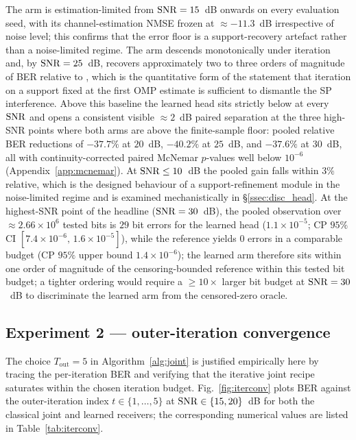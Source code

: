 The \Serial{} arm is estimation-limited from $\mathrm{SNR} = 15$~dB onwards on every evaluation seed, with its channel-estimation NMSE frozen at $\approx -11.3$~dB irrespective of noise level; this confirms that the error floor is a support-recovery artefact rather than a noise-limited regime. The \ClassicalJoint{} arm descends monotonically under iteration and, by $\mathrm{SNR} = 25$~dB, recovers approximately two to three orders of magnitude of BER relative to \Serial{}, which is the quantitative form of the statement that iteration on a support fixed at the first OMP estimate is sufficient to dismantle the SP interference. Above this baseline the learned head sits strictly below \ClassicalJoint{} at every $\mathrm{SNR}$ and opens a consistent visible $\approx 2$~dB paired separation at the three high-SNR points where both arms are above the finite-sample floor: pooled relative BER reductions of $-37.7\%$ at $20$~dB, $-40.2\%$ at $25$~dB, and $-37.6\%$ at $30$~dB, all with continuity-corrected paired McNemar $p$-values well below $10^{-6}$ (Appendix~\ref{app:mcnemar}). At $\mathrm{SNR} \leq 10$~dB the pooled gain falls within $3\%$ relative, which is the designed behaviour of a support-refinement module in the noise-limited regime and is examined mechanistically in \S\ref{ssec:disc_head}. At the highest-SNR point of the headline ($\mathrm{SNR} = 30$~dB), the pooled observation over $\approx 2.66 \times 10^{6}$ tested bits is $29$ bit errors for the learned head ($1.1 \times 10^{-5}$; CP $95\%$ CI $[7.4 \times 10^{-6},\, 1.6 \times 10^{-5}]$), while the \Oracle{} reference yields $0$ errors in a comparable budget (CP $95\%$ upper bound $1.4 \times 10^{-6}$); the learned arm therefore sits within one order of magnitude of the censoring-bounded reference within this tested bit budget; a tighter ordering would require a $\geq 10\times$ larger bit budget at $\mathrm{SNR} = 30$~dB to discriminate the learned arm from the censored-zero oracle.

\subsection{Experiment 2 --- outer-iteration convergence}
\label{ssec:iterconv}

The choice $T_\text{out} = 5$ in Algorithm~\ref{alg:joint} is justified empirically here by tracing the per-iteration BER and verifying that the iterative joint recipe saturates within the chosen iteration budget. Fig.~\ref{fig:iterconv} plots BER against the outer-iteration index $t \in \{1, \dots, 5\}$ at $\mathrm{SNR} \in \{15, 20\}$~dB for both the classical joint and learned receivers; the corresponding numerical values are listed in Table~\ref{tab:iterconv}.

